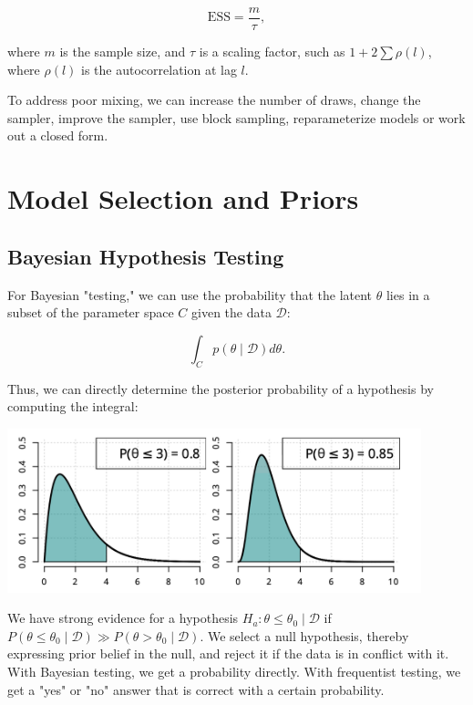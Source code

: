\[
	\mathrm{ESS} = \frac{m}{\tau},
\]

where $m$ is the sample size, and $\tau$ is a scaling factor, such as $1+2\sum\rho(l)$, where $\rho(l)$ is the autocorrelation at lag $l$.

To address poor mixing, we can increase the number of draws, change the sampler, improve the sampler, use block sampling, reparameterize models or work out a closed form.



\section{Model Selection and Priors}

\subsection{Bayesian Hypothesis Testing}

For Bayesian "testing," we can use the probability that the latent $\theta$ lies in a subset of the parameter space $C$ given the data $\mathcal{D}$:

\begin{equation}
	\int_C p(\theta\mid\mathcal{D})d\theta.
\end{equation}

Thus, we can directly determine the posterior probability of a hypothesis by computing the integral:

\begin{center}
	\includegraphics[width=12cm]{posteriorhypothesis.png}
\end{center}

We have strong evidence for a hypothesis $H_a:\theta \leq \theta_0\mid \mathcal{D}$ if $P(\theta\leq \theta_0\mid\mathcal{D}) \gg P(\theta > \theta_0\mid\mathcal{D})$. We select a null hypothesis, thereby expressing prior belief in the null, and reject it if the data is in conflict with it. With Bayesian testing, we get a probability directly. With frequentist testing, we get a "yes" or "no" answer that is correct with a certain probability.

